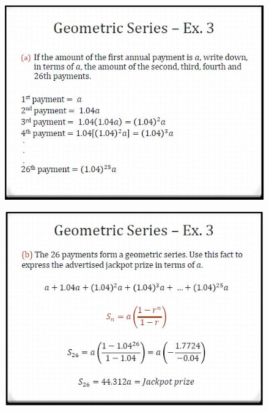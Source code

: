 \documentclass{beamer}
\begin{document}
\begin{frame}
	\begin{figure}
		\centering
		\includegraphics[width=0.99\linewidth]{SeqSer20C}
	\end{figure}
	
\end{frame}	
\begin{frame}
	\begin{figure}
		\centering
		\includegraphics[width=0.99\linewidth]{SeqSer20D}
	\end{figure}
	
\end{frame}
\end{document}
